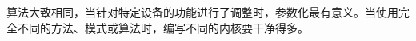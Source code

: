 \begin{tcolorbox}[colback=red!5!white,colframe=red!75!black]
算法大致相同，当针对特定设备的功能进行了调整时，参数化最有意义。当使用完全不同的方法、模式或算法时，编写不同的内核要干净得多。
\end{tcolorbox}



























































